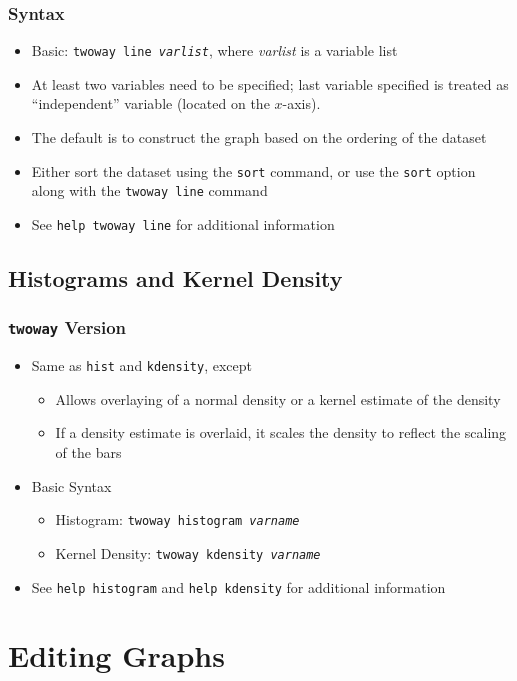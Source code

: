 \documentclass{beamer}
\begin{document}
\begin{frame}
	\frametitle{Syntax}
		\begin{itemize}
			\item Basic: \texttt{twoway line \textit{varlist}}, where \textit{varlist} is a variable list
			\item At least two variables need to be specified; last variable specified is treated as ``independent'' variable (located on the $x$-axis).
			\item The default is to construct the graph based on the ordering of the dataset
			\item Either sort the dataset using the \texttt{sort} command, or use the \texttt{sort} option along with the \texttt{twoway line} command
			\item See \texttt{help twoway line} for additional information
		\end{itemize}
\end{frame}

\subsection{Histograms and Kernel Density}

\begin{frame}
	\frametitle{\texttt{twoway} Version}
		\begin{itemize}
			\item Same as \texttt{hist} and \texttt{kdensity}, except
				\begin{itemize}
					\item Allows overlaying of a normal density or a kernel estimate of the density
					\item If a density estimate is overlaid, it scales the density to reflect the scaling of the bars
				\end{itemize}
			\item Basic Syntax
				\begin{itemize}
					\item Histogram: \texttt{twoway histogram \textit{varname}}
					\item Kernel Density: \texttt{twoway kdensity \textit{varname}}
				\end{itemize}
			\item See \texttt{help histogram} and \texttt{help kdensity} for additional information
		\end{itemize}
\end{frame}

\section{Editing Graphs}
\end{document}
